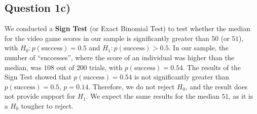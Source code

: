 \documentclass[
]{article}
\newenvironment{Shaded}{\begin{snugshade}}{\end{snugshade}}
\newcommand{\AttributeTok}[1]{\textcolor[rgb]{0.13,0.29,0.53}{#1}}
\newcommand{\CommentTok}[1]{\textcolor[rgb]{0.56,0.35,0.01}{\textit{#1}}}
\newcommand{\DecValTok}[1]{\textcolor[rgb]{0.00,0.00,0.81}{#1}}
\newcommand{\FunctionTok}[1]{\textcolor[rgb]{0.13,0.29,0.53}{\textbf{#1}}}
\newcommand{\NormalTok}[1]{#1}
\newcommand{\OtherTok}[1]{\textcolor[rgb]{0.56,0.35,0.01}{#1}}
\newcommand{\SpecialCharTok}[1]{\textcolor[rgb]{0.81,0.36,0.00}{\textbf{#1}}}
\newcommand{\StringTok}[1]{\textcolor[rgb]{0.31,0.60,0.02}{#1}}
\begin{document}
\hypertarget{question-1c}{%
\subsection{Question 1c)}\label{question-1c}}

\begin{Shaded}
\end{Shaded}

We conducted a \textbf{Sign Test} (or Exact Binomial Test) to test
whether the median for the video game scores in our sample is
significantly greater than \(50\) (or \(51\)), with
\(H_0 : p(\text{success}) = 0.5\) and \(H_1 : p(\text{success}) > 0.5\).
In our sample, the number of ``successes'', where the score of an
individual was higher than the median, was \(108\) out of \(200\)
trials, with \(p(\text{success}) = 0.54\). The results of the Sign Test
showed that \(p(\text{success}) = 0.54\) is not significantly greater
than \(p(\text{success}) = 0.5\), \(p = 0.14\). Therefore, we do not
reject \(H_0\), and the result does not provide support for \(H_1\). We
expect the same results for the median \(51\), as it is a \(H_0\)
tougher to reject.
\end{document}
